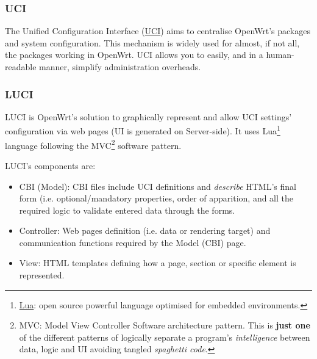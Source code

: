 \subsubsection{UCI}
The Unified Configuration Interface (\href{https://wiki.openwrt.org/doc/uci}{UCI}) aims to centralise OpenWrt's packages and system configuration. This mechanism is widely used for almost, if not all, the packages working in OpenWrt. UCI allows you to easily, and in a human-readable manner, simplify administration overheads.

\subsubsection{LUCI}
LUCI is OpenWrt's solution to graphically represent and allow UCI settings' configuration via web pages (UI is generated on Server-side). It uses Lua\footnote{\href{https://www.lua.org/manual/5.1/}{Lua}: open source powerful language optimised for embedded environments.} language following the MVC\footnote{MVC: Model View Controller Software architecture pattern. This is \textbf{just one} of the different patterns of logically separate a program's \textit{intelligence} between data, logic and UI avoiding tangled \textit{spaghetti code}.} software pattern.

LUCI's components are:
\begin{itemize}
    \item CBI (Model): CBI files include UCI definitions and \textit{describe} HTML's final form (i.e. optional/mandatory properties, order of apparition, and all the required logic to validate entered data through the forms.
    \item Controller: Web pages definition (i.e. data or rendering target) and communication functions required by the Model (CBI) page.
    \item View: HTML templates defining how a page, section or specific element is represented.
\end{itemize}


